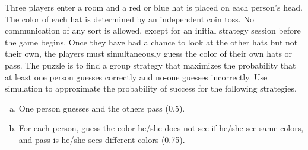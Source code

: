 \documentclass[12pt]{article}
\begin{document}
Three players enter a room and a red or blue hat is placed on each
  person's head.  The color of each hat is determined by an independent coin
  toss. No communication of any sort is allowed, except for an initial strategy
  session before the game begins.  Once they have had a chance to look at the
  other hats but not their own, the players must simultaneously guess the
  color of their own hats or pass. The puzzle is to find a group strategy that
  maximizes the probability that at least one person guesses correctly and
  no-one guesses incorrectly. Use simulation to approximate the probability of success for the following strategies.
  \begin{enumerate}[a.]
  \item One person guesses and the others pass (0.5). 
  \item For each person, guess the color he/she does
    not see if he/she see same colors, and pass is he/she sees different
    colors (0.75).
  \end{enumerate}
\end{document}
